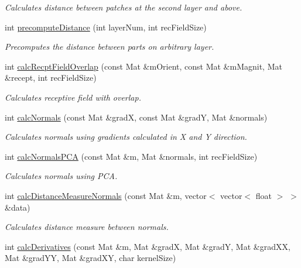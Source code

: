 \begin{DoxyCompactItemize}
\begin{DoxyCompactList}\small\item\em Calculates distance between patches at the second layer and above. \end{DoxyCompactList}\item 
int \hyperlink{class_first_layer_a5660027541994b18f6be950ff73bb403}{precompute\-Distance} (int layer\-Num, int rec\-Field\-Size)
\begin{DoxyCompactList}\small\item\em Precomputes the distance between parts on arbitrary layer. \end{DoxyCompactList}\item 
int \hyperlink{class_first_layer_abe9d6d5d83ef778ea076140cc9ecc9e2}{calc\-Recpt\-Field\-Overlap} (const Mat \&m\-Orient, const Mat \&m\-Magnit, Mat \&recept, int rec\-Field\-Size)
\begin{DoxyCompactList}\small\item\em Calculates receptive field with overlap. \end{DoxyCompactList}\item 
int \hyperlink{class_first_layer_abcfc2aa2add70a95cab3e6d5c6bde6a7}{calc\-Normals} (const Mat \&grad\-X, const Mat \&grad\-Y, Mat \&normals)
\begin{DoxyCompactList}\small\item\em Calculates normals using gradients calculated in X and Y direction. \end{DoxyCompactList}\item 
int \hyperlink{class_first_layer_a028b3d6af0b7196ef5478c45bbda9e97}{calc\-Normals\-P\-C\-A} (const Mat \&m, Mat \&normals, int rec\-Field\-Size)
\begin{DoxyCompactList}\small\item\em Calculates normals using P\-C\-A. \end{DoxyCompactList}\item 
int \hyperlink{class_first_layer_ae5981a6b0f49fd66692da5001ff4b021}{calc\-Distance\-Measure\-Normals} (const Mat \&m, vector$<$ vector$<$ float $>$ $>$ \&data)
\begin{DoxyCompactList}\small\item\em Calculates distance measure between normals. \end{DoxyCompactList}\item 
int \hyperlink{class_first_layer_ad26c3c16c6dd6050d17ce6165ce58bef}{calc\-Derivatives} (const Mat \&m, Mat \&grad\-X, Mat \&grad\-Y, Mat \&grad\-X\-X, Mat \&grad\-Y\-Y, Mat \&grad\-X\-Y, char kernel\-Size)

\end{DoxyCompactItemize}
